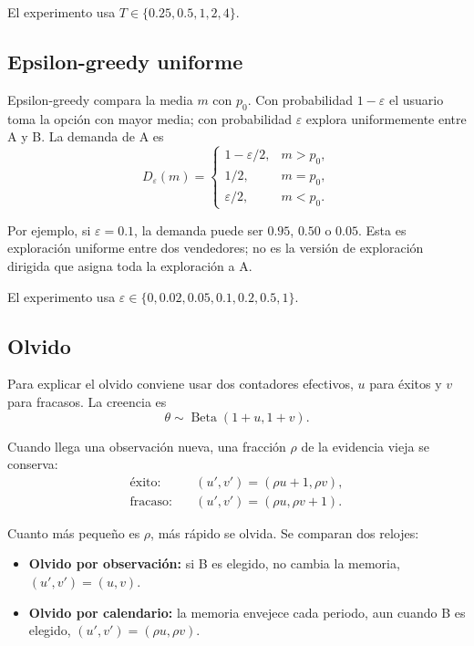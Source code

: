 \documentclass[11pt]{article}
\newcommand{\BetaDist}{\operatorname{Beta}}
\begin{document}
El experimento usa $T\in\{0.25,0.5,1,2,4\}$.

\subsection{Epsilon-greedy uniforme}

Epsilon-greedy compara la media $m$ con $p_0$. Con probabilidad
$1-\varepsilon$ el usuario toma la opción con mayor media; con probabilidad
$\varepsilon$ explora uniformemente entre A y B. La demanda de A es
\begin{equation}
D_{\varepsilon}(m)=
\begin{cases}
1-\varepsilon/2, & m>p_0,\\
1/2, & m=p_0,\\
\varepsilon/2, & m<p_0.
\end{cases}
\end{equation}

Por ejemplo, si $\varepsilon=0.1$, la demanda puede ser $0.95$, $0.50$ o
$0.05$. Esta es exploración uniforme entre dos vendedores; no es la versión
de exploración dirigida que asigna toda la exploración a A.

El experimento usa
$\varepsilon\in\{0,0.02,0.05,0.1,0.2,0.5,1\}$.

\subsection{Olvido}

Para explicar el olvido conviene usar dos contadores efectivos, $u$ para
éxitos y $v$ para fracasos. La creencia es
\begin{equation}
  \theta\sim\BetaDist(1+u,1+v).
\end{equation}

Cuando llega una observación nueva, una fracción $\rho$ de la evidencia vieja
se conserva:
\begin{align}
  \text{éxito:}\quad &(u',v')=(\rho u+1,\rho v),\\
  \text{fracaso:}\quad &(u',v')=(\rho u,\rho v+1).
\end{align}

Cuanto más pequeño es $\rho$, más rápido se olvida. Se comparan dos relojes:

\begin{itemize}
  \item \textbf{Olvido por observación:} si B es elegido, no cambia la memoria,
  $(u',v')=(u,v)$.
  \item \textbf{Olvido por calendario:} la memoria envejece cada periodo, aun
  cuando B es elegido, $(u',v')=(\rho u,\rho v)$.
\end{itemize}
\end{document}

